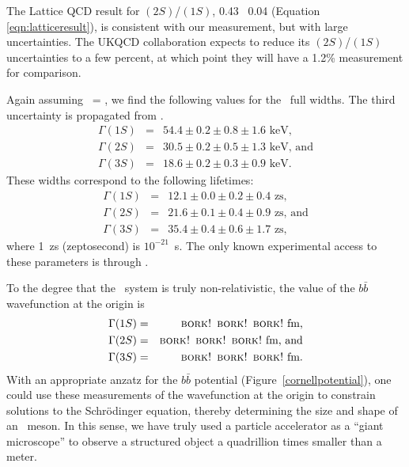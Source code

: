\documentclass{cornell}
\begin{document}
The Lattice QCD result for \gee$(2S)$/\gee$(1S)$, 0.43 \PM\ 0.04
(Equation \ref{eqn:latticeresult}), is consistent with our
measurement, but with large uncertainties.  The UKQCD collaboration
expects to reduce its \gee$(2S)$/\gee$(1S)$ uncertainties to a few
percent, at which point they will have a 1.2\% measurement for
comparison.

Again assuming \bee\ = \bmm, we find the following values for the
\ups\ full widths.  The third uncertainty is propagated from \bmm.
\begin{eqnarray}
  \Gamma(1S) &=& 54.4 \pm 0.2 \pm 0.8 \pm 1.6 \mbox{ keV,} \\
  \Gamma(2S) &=& 30.5 \pm 0.2 \pm 0.5 \pm 1.3 \mbox{ keV, and} \\
  \Gamma(3S) &=& 18.6 \pm 0.2 \pm 0.3 \pm 0.9 \mbox{ keV.}
\end{eqnarray}
These widths correspond to the following lifetimes:
\begin{eqnarray}
  \Gamma(1S) &=& 12.1 \pm 0.0 \pm 0.2 \pm 0.4 \mbox{ zs,} \\
  \Gamma(2S) &=& 21.6 \pm 0.1 \pm 0.4 \pm 0.9 \mbox{ zs, and} \\
  \Gamma(3S) &=& 35.4 \pm 0.4 \pm 0.6 \pm 1.7 \mbox{ zs,}
\end{eqnarray}
where 1~zs (zeptosecond) is $10^{-21}$~s.  The only known experimental
access to these parameters is through \gee.

To the degree that the \ups\ system is truly non-relativistic,
the value of the $b\bar{b}$ wavefunction at the origin is
\begin{eqnarray}
  \Gamma(1S) &=& \mbox{\sc bork! bork! bork!} \mbox{ fm,} \\
  \Gamma(2S) &=& \mbox{\sc bork! bork! bork!} \mbox{ fm, and} \\
  \Gamma(3S) &=& \mbox{\sc bork! bork! bork!} \mbox{ fm.}
\end{eqnarray}
With an appropriate anzatz for the $b\bar{b}$ potential (Figure~\ref{cornellpotential}), one could use these measurements of the
wavefunction at the origin to constrain solutions to the Schr\"odinger
equation, thereby determining the size and shape of an \ups\ meson.
In this sense, we have truly used a particle accelerator as a ``giant
microscope'' to observe a structured object a quadrillion times
smaller than a meter.
\end{document}
